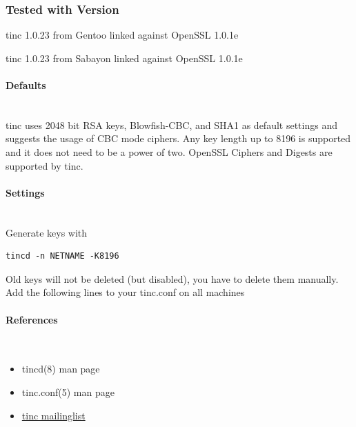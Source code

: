 \subsubsection{Tested with Version}
\begin{itemize*}
  \item tinc 1.0.23 from Gentoo linked against OpenSSL 1.0.1e
  \item tinc 1.0.23 from Sabayon linked against OpenSSL 1.0.1e
\end{itemize*}

\paragraph*{Defaults}\mbox{}\\
tinc uses 2048 bit RSA keys, Blowfish-CBC, and SHA1 as default settings and suggests the usage of CBC mode ciphers.
Any key length up to 8196 is supported and it does not need to be a power of two. OpenSSL Ciphers and Digests are supported by tinc.

\paragraph*{Settings}\mbox{}\\
Generate keys with
\begin{lstlisting}[breaklines]
tincd -n NETNAME -K8196
\end{lstlisting}
Old keys will not be deleted (but disabled), you have to delete them manually. Add the following lines to your tinc.conf on all machines

\paragraph*{References}\mbox{}\\
\begin{itemize}
\item tincd(8) man page
\item tinc.conf(5) man page
\item \href{http://www.tinc-vpn.org/pipermail/tinc/2014-January/003538.html}{tinc mailinglist}
\end{itemize}












